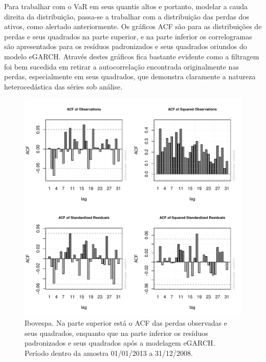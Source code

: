 \documentclass[review]{elsarticle}
\theoremstyle{definition}
\begin{document}


Para trabalhar com o VaR em seus quantis altos e portanto, modelar a cauda direita da distribuição, passa-se a trabalhar com a distribuição das perdas dos ativos, como alertado anteriormente. Os gráficos ACF são para as distribuições de perdas e seus quadrados na parte superior, e na parte inferior os correlogramas são apresentados para os resíduos padronizados e seus quadrados oriundos do modelo eGARCH. Através destes gráficos fica bastante evidente como a filtragem foi bem sucedida em retirar a autocorrelação encontrada originalmente nas perdas, especialmente em seus quadrados, que demonstra claramente a natureza heterocedástica das séries sob análise. 

\begin{figure}[H]
	\centering
	\includegraphics[width=1\linewidth]{figs/artigo-acf-IBovespa}
	\caption{Ibovespa. Na parte superior está o ACF das perdas observadas e seus quadrados, enquanto que na parte inferior os resíduos padronizados e seus quadrados após a modelagem eGARCH. Período dentro da amostra 01/01/2013 a 31/12/2008.}
	\label{fig:artigo-acf-ibovespa}
\end{figure}
\end{document}
